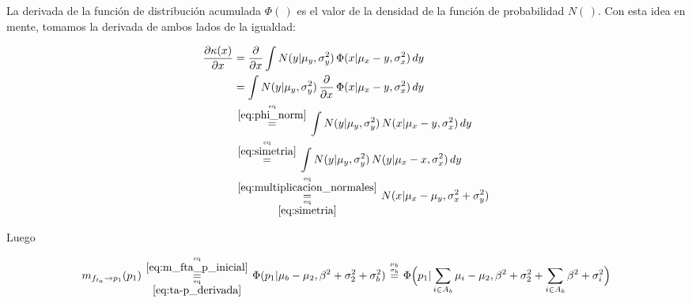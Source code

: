 \documentclass[article]{jss}
\newcommand\hfrac[2]{\genfrac{}{}{0pt}{}{#1}{#2}} %
\begin{document}
\begin{appendix}
La derivada de la funci\'on de distribuci\'on acumulada $\Phi(\,)$ es el valor de la densidad de la funci\'on de probabilidad $N(\,)$. Con esta idea en mente, tomamos la derivada de ambos lados de la igualdad:

\begin{equation}\label{eq:ta-p_derivada}
\begin{split}
\frac{\partial\kappa(x)}{\partial x} &= \frac{\partial}{\partial x} \int  N(y| \mu_y, \sigma_y^2 ) \,   \Phi (x | \mu_x -y , \sigma_x^2 ) \, dy \\
&= \int  N(y| \mu_y, \sigma_y^2 ) \, \frac{\partial}{\partial x} \,\Phi (x| \mu_x - y, \sigma_x^2 )  \, dy   \\
& \overset{\hfrac{\text{eq}}{\ref{eq:phi_norm}}}{=} \int  N(y| \mu_y, \sigma_y^2 ) \, N(x| \mu_x -y , \sigma_x^2)  \, dy  \\
& \overset{\hfrac{\text{eq}}{\ref{eq:simetria}}}{=} \int  N(y| \mu_y, \sigma_y^2 ) \, N(y| \mu_x  -x , \sigma_x^2)  \, dy  \\
&\overset{\hfrac{\text{eq}}{\ref{eq:multiplicacion_normales}}}{\underset{\hfrac{\text{eq}}{\ref{eq:simetria}}}{=}} N(x| \mu_x - \mu_y, \sigma_x^2 + \sigma_y^2) 
\end{split}
\end{equation}

Luego

\begin{equation}\label{eq:m_fta_p}
 m_{f_{t_a} \rightarrow p_1}(p_1) \overset{\hfrac{\text{eq}}{\ref{eq:m_fta_p_inicial}}}{\underset{\hfrac{\text{eq}}{\ref{eq:ta-p_derivada}}}{=}}  \Phi(p_1| \mu_b - \mu_2, \beta^2 + \sigma_2^2 + \sigma_b^2)  \overset{\hfrac{\mu_b}{\sigma_b}}{=}  \Phi\Big(p_1| \sum_{i \in A_b} \mu_i - \mu_2, \beta^2 + \sigma_2^2 + \sum_{i \in A_b} \beta^2 + \sigma_i^2 \Big) 
\end{equation}


\end{appendix}
\end{document}
